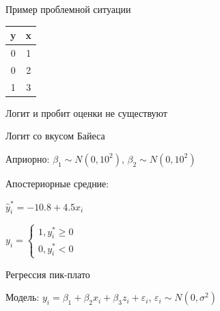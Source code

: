 \documentclass[ignorenonframetext,]{beamer}
\newcommand{\e}{\varepsilon}
\newcommand{\hy}{\hat{y}}
\begin{document}
\begin{frame}{Пример проблемной ситуации}

\begin{longtable}[c]{@{}cc@{}}
\toprule
\begin{minipage}[b]{0.05\columnwidth}\centering\strut
y
\strut\end{minipage} &
\begin{minipage}[b]{0.05\columnwidth}\centering\strut
x
\strut\end{minipage}\tabularnewline
\midrule
\endhead
\begin{minipage}[t]{0.05\columnwidth}\centering\strut
0
\strut\end{minipage} &
\begin{minipage}[t]{0.05\columnwidth}\centering\strut
1
\strut\end{minipage}\tabularnewline
\begin{minipage}[t]{0.05\columnwidth}\centering\strut
0
\strut\end{minipage} &
\begin{minipage}[t]{0.05\columnwidth}\centering\strut
2
\strut\end{minipage}\tabularnewline
\begin{minipage}[t]{0.05\columnwidth}\centering\strut
1
\strut\end{minipage} &
\begin{minipage}[t]{0.05\columnwidth}\centering\strut
3
\strut\end{minipage}\tabularnewline
\bottomrule
\end{longtable}

Логит и пробит оценки не существуют

\end{frame}

\begin{frame}{Логит со вкусом Байеса}

Априорно: \(\beta_1 \sim N(0, 10^2)\), \(\beta_2 \sim N(0, 10^2)\)

Апостериорные средние:

\(\hy_i^*=-10.8 + 4.5 x_i\)

\(y_i=\begin{cases} 1, y^*_i \geq 0 \\ 0, y^*_i <0 \end{cases}\)

\end{frame}

\begin{frame}{Регрессия пик-плато}

Модель: \(y_i = \beta_1 + \beta_2 x_i + \beta_3 z_i +\e_i\),
\(\e_i \sim N(0, \sigma^2)\)

\end{frame}
\end{document}
